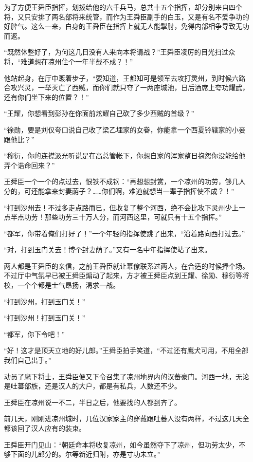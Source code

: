 为了方便王舜臣指挥，划拨给他的六千兵马，总共十五个指挥，却分别来自四个将，又只安排了两名部将来统管，而作为王舜臣副手的白玉，又是有名不爱争功的好脾气。这么一来，白身的王舜臣在指挥上就无人能掣肘，免得内部相争导致无功而返。

“既然休整好了，为何这几日没有人来向本将请战？”王舜臣凌厉的目光扫过众将，“难道想在凉州住个一年半载不成？！”

他站起身，在厅中踱着步子，“要知道，王都知可是领军去攻打灵州，到时候六路合攻兴灵，一举灭亡了西贼，而你们就只夺了一两座城池，日后酒席上夸功耀武，还有你们坐下来的位置？！”

“王耀，你想看到彭孙在你面前炫耀自己砍了多少西贼的首级？”

“徐勋，要是刘仅夸口说自己收了梁乙埋家的女眷，你能拿一个西夏钤辖家的小妾跟他比？”

“穆衍，你的连襟汲光听说是在高总管帐下，你想自家的浑家整日抱怨你没能给他弄个诰命回来？”

王舜臣一个一个的点过去，恨铁不成钢：“再想想封赏，一个凉州的功劳，够几人分的，可还能拿来封妻荫子？……你们啊，难道就想当一辈子指挥使不成？！”

“打到沙州去！不过多走点路而已，但收复了整个河西，绝不会比攻下灵州少上一点半点功劳！那些功劳三十万人分，而河西这里，可就只有十五个指挥。”

“都军，你带着俺们打好了！”一个年轻的指挥使跳了出来，“沿着路向西打过去。”

“对，打到玉门关去！博个封妻荫子。”又有一名中年指挥使站了出来。

两人都是王舜臣的亲信，之前王舜臣就让幕僚联系过两人，在合适的时候捧个场。不过厅中气氛早已被王舜臣煽动了起来，方才被王舜臣点到王耀、徐勋、穆衍等将校，一个个都是士气昂扬，渴求一战。

“打到沙州，打到玉门关！”

“打到沙州！打到玉门关！”

“都军，你下令吧！”

“好！这才是顶天立地的好儿郎。”王舜臣拍手笑道，“不过还有鹰犬可用，不用全部我们自己出手。”

动员了麾下将士，王舜臣便又下令召集了凉州地界内的汉蕃豪门。河西一地，无论是吐蕃部族，还是汉人的大户，都是有私兵，人数还不少。

王舜臣在凉州说一不二，半日之后，他要找的人都到齐了。

前几天，刚刚进凉州城时，几位汉家家主的穿戴跟吐蕃人没有两样，不过这几天全都该回了汉人应有的装束。

王舜臣开门见山：“朝廷命本将收复凉州，如今虽然夺下了凉州，但功劳太少，不够下面的儿郎分的。尔等新近归附，亦是寸功未立。”

